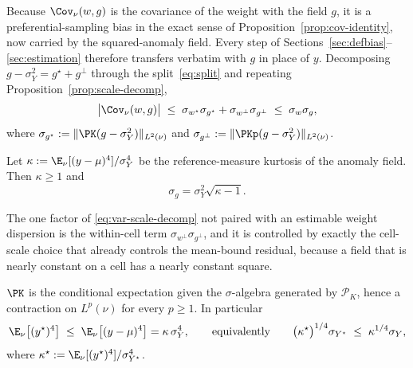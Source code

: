 Because $\Cov_\nu(w,g)$ is the covariance of the weight with the field
$g$, it is a preferential-sampling bias in the exact sense of
Proposition~\ref{prop:cov-identity}, now carried by the squared-anomaly
field. Every step of Sections~\ref{sec:defbias}--\ref{sec:estimation}
therefore transfers verbatim with $g$ in place of $y$. Decomposing
$g-\sigma_Y^2=g^{\star}+g^{\perp}$ through the split~\eqref{eq:split}
and repeating Proposition~\ref{prop:scale-decomp},
\begin{equation}
  \big|\Cov_\nu(w,g)\big|
  \;\le\;\sigma_{w^{\star}}\sigma_{g^{\star}}
        +\sigma_{w^{\perp}}\sigma_{g^{\perp}}
  \;\le\;\sigma_w\sigma_g ,
  \label{eq:var-scale-decomp}
\end{equation}
where
$\sigma_{g^{\star}}:=\|\PK(g-\sigma_Y^2)\|_{L^2(\nu)}$ and
$\sigma_{g^{\perp}}:=\|\PKp(g-\sigma_Y^2)\|_{L^2(\nu)}$.

\begin{lemma}
\label{lem:kurt}
Let $\kappa:=\E_\nu[(y-\mu)^4]/\sigma_Y^4$ be the reference-measure
kurtosis of the anomaly field. Then $\kappa\ge1$ and
\[
  \sigma_g=\sigma_Y^2\sqrt{\kappa-1}.
\]
\end{lemma}

The one factor of \eqref{eq:var-scale-decomp} not paired with an
estimable weight dispersion is the within-cell term
$\sigma_{w^{\perp}}\sigma_{g^{\perp}}$, and it is controlled by exactly
the cell-scale choice that already controls the mean-bound residual,
because a field that is nearly constant on a cell has a nearly constant
square.

\begin{lemma}
\label{lem:l4-contraction}
$\PK$ is the conditional expectation given the $\sigma$-algebra generated
by $\mathcal{P}_K$, hence a contraction on $L^p(\nu)$ for every
$p\ge1$. In particular
\[
  \E_\nu\big[(y^{\star})^4\big]\;\le\;\E_\nu\big[(y-\mu)^4\big]
  =\kappa\,\sigma_Y^4,
  \qquad\text{equivalently}\qquad
  \big(\kappa^{\star}\big)^{1/4}\sigma_{Y^{\star}}
  \;\le\;\kappa^{1/4}\sigma_Y ,
\]
where $\kappa^{\star}:=\E_\nu[(y^{\star})^4]/\sigma_{Y^{\star}}^4$.
\end{lemma}


